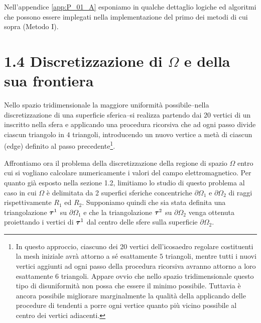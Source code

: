Nell'appendice \ref{app:P_01_A} esponiamo in qualche dettaglio logiche ed algoritmi che possono essere implegati nella implementazione del primo dei metodi di cui sopra (Metodo I). 

\pagebreak
\section*{1.4 Discretizzazione di $\Omega$ e della sua frontiera}\label{sec_1.4}

Nello spazio tridimensionale la maggiore uniformità possibile--nella discretizzazione di una superficie sferica--si realizza  partendo dai 20 vertici di un  inscritto nella sfera e applicando una procedura ricorsiva che ad ogni passo divide ciascun triangolo in $4$ triangoli, introducendo un nuovo vertice a metà di ciascun  (edge) definito al passo precedente\footnote{In questo approccio, ciascuno dei 20 vertici dell'icosaedro regolare costituenti la mesh iniziale avrà attorno a sé esattamente $5$ triangoli, mentre tutti i nuovi vertici aggiunti ad ogni passo della procedura ricorsiva avranno attorno a loro esattamente $6$ triangoli. Appare ovvio che nello spazio tridimensionale questo tipo di disuniformità non possa che essere il minimo possibile. Tuttavia è ancora possibile migliorare marginalmente la qualità della  applicando delle procedure di  tendenti a porre ogni vertice quanto più vicino possibile al centro dei vertici adiacenti.}. 

Affrontiamo ora il problema della discretizzazione della regione di spazio $\Omega$ entro cui si vogliano calcolare numericamente i valori del campo elettromagnetico. Per quanto già esposto nella sezione 1.2, limitiamo lo studio di questo problema al caso in cui $\Omega$ è delimitata da 2 superfici sferiche concentriche $\partial \Omega_1$ e $\partial \Omega_2$ di raggi rispettivamente $R_1$ ed $R_2$. Supponiamo quindi che sia stata definita una triangolazione $\vb*{\tau}^1$ su $\partial \Omega_1$ e che la triangolazione $\vb*{\tau}^2$ su $\partial \Omega_2$ venga ottenuta proiettando i vertici di $\vb*{\tau}^1$ dal centro delle sfere sulla superficie $\partial \Omega_2$.  

